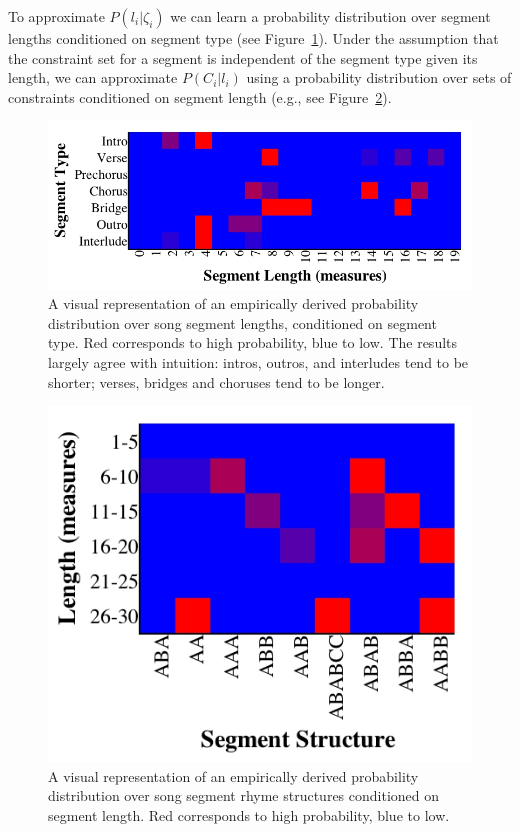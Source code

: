 \documentclass[phd,electronic,oneside,twosidetoc,letterpaper,chaptercenter,parttop,lof,lot]{byumsphd}
\begin{document}
To approximate $P(l_i|\zeta_i)$ we can learn a probability distribution over segment lengths conditioned on segment type (see Figure~\ref{fig:measure_count_by_segment}). Under the assumption that the constraint set for a segment is independent of the segment type given its length, we can approximate $P(C_i | l_i)$ using a probability distribution over sets of constraints conditioned on segment length (e.g., see Figure~\ref{fig:segment_structure}).

\begin{figure}
	\centering
	\includegraphics[width=\linewidth]{measure_count_by_segment}
	\caption{\label{fig:measure_count_by_segment} A visual representation of an empirically derived probability distribution over song segment lengths, conditioned on segment type. Red corresponds to high probability, blue to low. The results largely agree with intuition: intros, outros, and interludes tend to be shorter; verses, bridges and choruses tend to be longer.}
\end{figure}

\begin{figure}
	\centering
	\includegraphics[width=.7\linewidth]{segment_structure}
	\caption{\label{fig:segment_structure} A visual representation of an empirically derived probability distribution over song segment rhyme structures conditioned on segment length. Red corresponds to high probability, blue to low.}
\end{figure}
\end{document}
